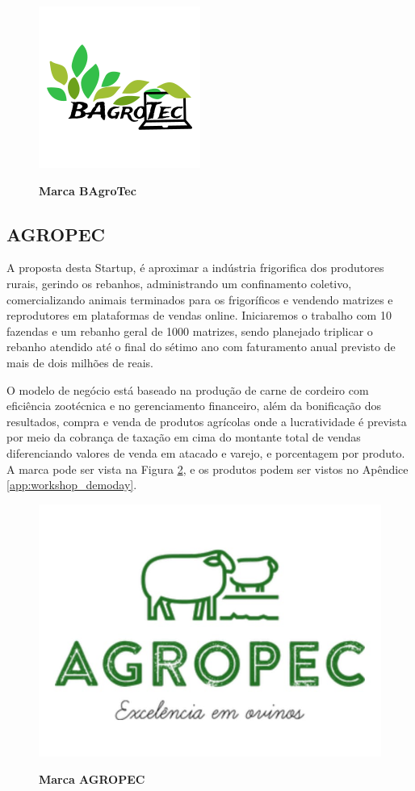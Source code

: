 \begin{figure}[H]
\centering
\caption{\textbf{Marca BAgroTec}}
\includegraphics[scale=15]{Imagens/bagrotec.png}
\label{figura_15}
\end{figure}


\subsection{AGROPEC}


A proposta desta Startup, é aproximar a indústria frigorifica dos produtores rurais, gerindo os rebanhos, administrando um confinamento coletivo, comercializando animais terminados para os frigoríficos e vendendo matrizes e reprodutores em plataformas de vendas online. Iniciaremos o trabalho com 10 fazendas e um rebanho geral de 1000 matrizes, sendo planejado triplicar o rebanho atendido até o final do sétimo ano com faturamento anual previsto de mais de dois milhões de reais.

O modelo de negócio está baseado na produção de carne de cordeiro com eficiência zootécnica e no gerenciamento financeiro, além da bonificação dos resultados, compra e venda de produtos agrícolas onde a lucratividade é prevista por meio da cobrança de taxação em cima do montante total de vendas diferenciando valores de venda em atacado e varejo, e porcentagem por produto. A marca pode ser vista na Figura \ref{figura_18}, e os produtos podem ser vistos no Apêndice \ref{app:workshop_demoday}.


\begin{figure}[H]
\centering
\caption{\textbf{Marca AGROPEC}}
\includegraphics[scale=0.3]{Imagens/agropec.jpg}
\label{figura_18}
\end{figure}

